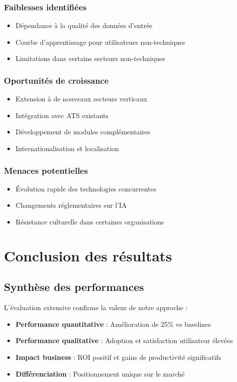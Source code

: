 \documentclass[12pt,a4paper]{report}
\begin{document}
\subsubsection{Faiblesses identifiées}

\begin{itemize}
\item Dépendance à la qualité des données d'entrée
\item Courbe d'apprentissage pour utilisateurs non-techniques
\item Limitations dans certains secteurs non-techniques
\end{itemize}

\subsubsection{Oportunités de croissance}

\begin{itemize}
\item Extension à de nouveaux secteurs verticaux
\item Intégration avec ATS existants
\item Développement de modules complémentaires
\item Internationalisation et localisation
\end{itemize}

\subsubsection{Menaces potentielles}

\begin{itemize}
\item Évolution rapide des technologies concurrentes
\item Changements réglementaires sur l'IA
\item Résistance culturelle dans certaines organisations
\end{itemize}

\section{Conclusion des résultats}

\subsection{Synthèse des performances}

L'évaluation extensive confirme la valeur de notre approche :
\begin{itemize}
\item \textbf{Performance quantitative} : Amélioration de 25\% vs baselines
\item \textbf{Performance qualitative} : Adoption et satisfaction utilisateur élevées
\item \textbf{Impact business} : ROI positif et gains de productivité significatifs
\item \textbf{Différenciation} : Positionnement unique sur le marché
\end{itemize}
\end{document}
